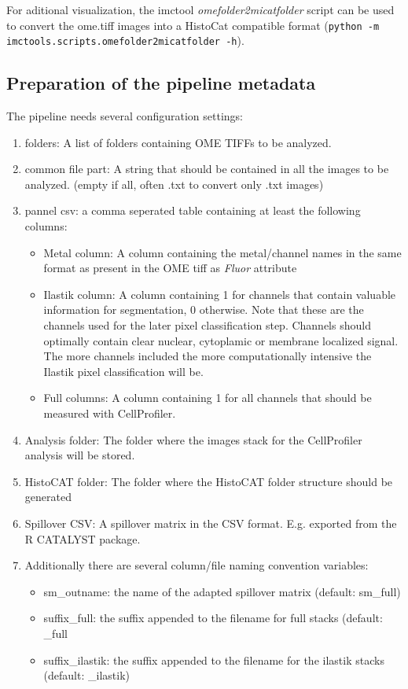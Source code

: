 \documentclass[a4paper]{article}
\begin{document}
For aditional visualization, the imctool \textit{omefolder2micatfolder} script can be used to convert the
ome.tiff images into a HistoCat compatible format (\texttt{python -m imctools.scripts.omefolder2micatfolder -h}).

\subsection{Preparation of the pipeline metadata}
The pipeline needs several configuration settings:
\begin{enumerate}
\item folders: A  list of folders containing OME TIFFs to be analyzed.
\item common file part: A string that should be contained in all the images to be analyzed. (empty
if all, often .txt to convert only .txt images)
\item pannel csv: a comma seperated table containing at least the following columns:

\begin{itemize}
\item Metal column: A column containing the metal/channel names in the same format as present in
	the OME tiff as \textit{Fluor} attribute
\item Ilastik column: A column containing 1 for channels that contain valuable information for
segmentation, 0 otherwise. Note that these are the channels used for the later pixel classification
step. Channels should optimally contain clear nuclear, cytoplamic or membrane localized signal. The
more channels included the more computationally intensive the Ilastik pixel classification will be.
\item Full columns: A column containing 1 for all channels that should be measured with
CellProfiler.
\end{itemize}

\item Analysis folder: The folder where the images stack for the CellProfiler analysis will be
stored.
\item HistoCAT folder: The folder where the HistoCAT folder structure should be generated

\item Spillover CSV: A spillover matrix in the CSV format. E.g. exported from the R CATALYST
package.


\item Additionally there are several column/file naming convention variables:

\begin{itemize}
\item sm\_outname: the name of the adapted spillover matrix (default: sm\_full)
\item suffix\_full: the suffix appended to the filename for full stacks (default: \_full
\item suffix\_ilastik: the suffix appended to the filename for the ilastik stacks (default:
\_ilastik)
\end{itemize}
\end{enumerate}
\end{document}
